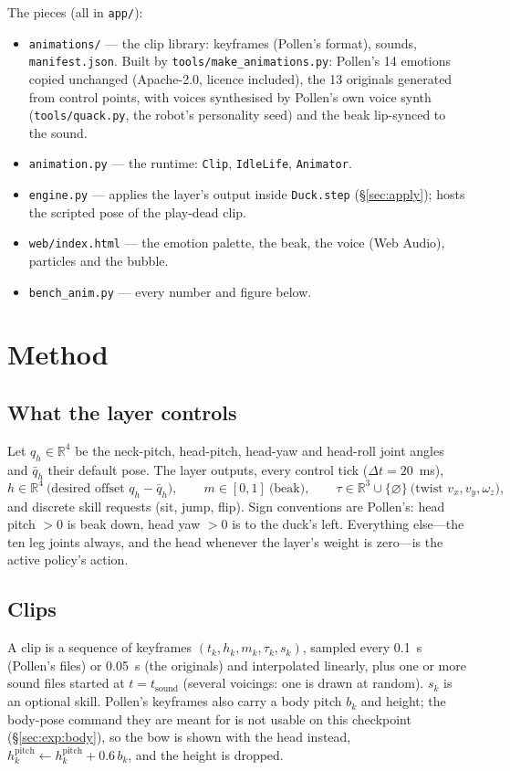 \documentclass[11pt]{article}
\newcommand{\code}[1]{\texttt{\small #1}}
\begin{document}
The pieces (all in \code{app/}):
\begin{itemize}[nosep]
\item \code{animations/} --- the clip library: keyframes (Pollen's format), sounds, \code{manifest.json}. Built by
  \code{tools/make\_animations.py}: Pollen's 14 emotions copied unchanged (Apache-2.0, licence included), the 13
  originals generated from control points, with voices synthesised by Pollen's own voice synth
  (\code{tools/quack.py}, the robot's personality seed) and the beak lip-synced to the sound.
\item \code{animation.py} --- the runtime: \code{Clip}, \code{IdleLife}, \code{Animator}.
\item \code{engine.py} --- applies the layer's output inside \code{Duck.step} (\S\ref{sec:apply}); hosts the
  scripted pose of the play-dead clip.
\item \code{web/index.html} --- the emotion palette, the beak, the voice (Web Audio), particles and the bubble.
\item \code{bench\_anim.py} --- every number and figure below.
\end{itemize}

\section{Method}\label{sec:method}
\subsection{What the layer controls}
Let $q_h\in\mathbb{R}^4$ be the neck-pitch, head-pitch, head-yaw and head-roll joint angles and $\bar q_h$ their
default pose. The layer outputs, every control tick ($\Delta t = 20$~ms),
\[
  h\in\mathbb{R}^4 \ \text{(desired offset } q_h-\bar q_h\text{)},\qquad m\in[0,1]\ \text{(beak)},\qquad
  \tau\in\mathbb{R}^3\cup\{\varnothing\}\ \text{(twist } v_x,v_y,\omega_z\text{)},
\]
and discrete skill requests (sit, jump, flip). Sign conventions are Pollen's: head pitch $>0$ is beak down, head yaw
$>0$ is to the duck's left. Everything else---the ten leg joints always, and the head whenever the layer's weight is
zero---is the active policy's action.

\subsection{Clips}
A clip is a sequence of keyframes $(t_k, h_k, m_k, \tau_k, s_k)$, sampled every 0.1~s (Pollen's files) or 0.05~s
(the originals) and interpolated linearly, plus one or more sound files started at $t=t_\text{sound}$ (several
voicings: one is drawn at random). $s_k$ is an optional skill. Pollen's keyframes also carry a body pitch $b_k$ and
height; the body-pose command they are meant for is not usable on this checkpoint (\S\ref{sec:exp:body}), so the bow is
shown with the head instead, $h^\text{pitch}_k \leftarrow h^\text{pitch}_k + 0.6\,b_k$, and the height is dropped.
\end{document}
